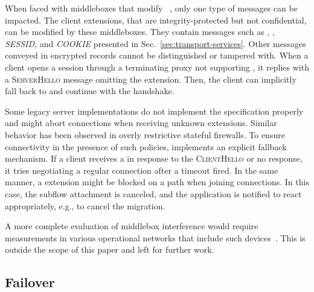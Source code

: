 When faced with middleboxes that modify ~\cite{Bock_China,raman2020measuring}, only one type of \tcpls messages can be impacted. The client \tls extensions, that are integrity-protected but not confidential, can be modified by these middleboxes. They contain messages such as \hello, \join, \textit{SESSID}, and \textit{COOKIE} presented
in Sec.~\ref{sec:transport-services}. Other messages conveyed in encrypted \tls records cannot be distinguished or tampered with. When a client opens a \tcpls session through a \tls terminating proxy not supporting \tcpls, it replies
with a \textsc{ServerHello} message omitting the \hello extension. Then, the client can implicitly fall back to \tls and continue with the handshake.

Some legacy \tls server implementations do not implement the \tls specification properly and might abort connections when receiving unknown \tls extensions. Similar behavior has been observed in overly restrictive stateful firewalls. To ensure connectivity in the presence of such policies, \tcpls implements an explicit fallback mechanism. If a client receives a \tcp \rst in response to the \tcpls \textsc{ClientHello} or no response, it tries negotiating a regular \tls connection after a timeout fired. In the same manner, a \join extension might be blocked on a path when joining connections. In this case, the subflow
attachment is canceled, and the application is notified to react appropriately, e.g., to cancel the migration.

A more complete evaluation of middlebox interference would require measurements
in various operational networks that include such
devices~\cite{honda2011still,raman2020measuring,o2016tls}. This is
outside the scope of this paper and left for further work.



\subsection{Failover}
\label{sec:eval_failover}

